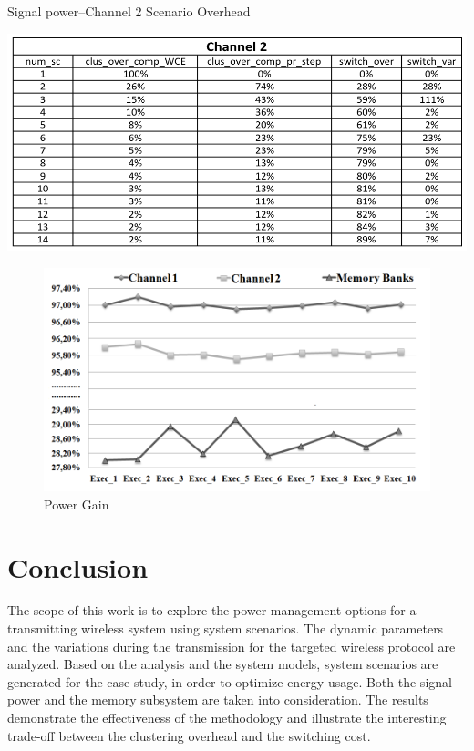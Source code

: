 \begin{table}
\centering
	\caption{Signal power–Channel 2 Scenario Overhead}
	\label{tab:F3}
	\includegraphics[width=\textwidth]{F/tab3.png}
\end{table} 

\begin{figure}
\centering
\includegraphics[width=\textwidth]{F/image15.png}
\caption{Power Gain}
\label{fig:F8}
\end{figure}	 

\section{Conclusion} 

The scope of this work is to explore the power management options for a transmitting wireless system using system scenarios. The dynamic parameters and the variations during the transmission for the targeted wireless protocol are analyzed. Based on the analysis and the system models, system scenarios are generated for the case study, in order to optimize energy usage. Both the signal power and the memory subsystem are taken into consideration. The results demonstrate the effectiveness of the methodology and illustrate the interesting trade-off between the clustering overhead and the switching cost. 
	
%
%
	
	
